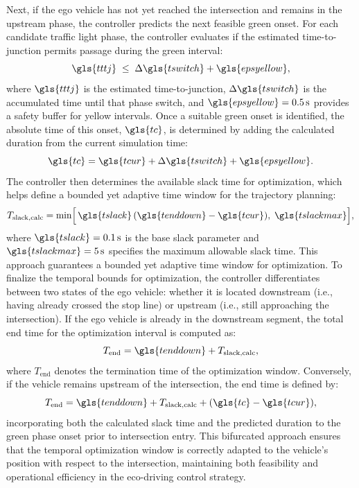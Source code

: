 \mynewline
Next, if the ego vehicle has not yet reached the intersection and remains in the upstream phase, the controller predicts the next feasible green onset. For each candidate traffic light phase, the controller evaluates if the estimated time-to-junction permits passage during the green interval:
\begin{equation}
   \gls{tttj} \;\le\; \Delta \gls{tswitch} + \gls{epsyellow},
\end{equation}
where $\gls{tttj}$ is the estimated time-to-junction, $\Delta \gls{tswitch}$ is the accumulated time until that phase switch, and $\gls{epsyellow}=0.5\,\unit{s}$ provides a safety buffer for yellow intervals. Once a suitable green onset is identified, the absolute time of this onset, $\gls{tc}$, is determined by adding the calculated duration from the current simulation time:
\begin{equation}
   \gls{tc}
   = \gls{tcur} + \Delta\gls{tswitch} + \gls{epsyellow}.
\end{equation}
The controller then determines the available slack time for optimization, which helps define a bounded yet adaptive time window for the trajectory planning:
\begin{equation}
   T_{\mathrm{slack,calc}} = \min\Bigl[\, \gls{tslack}\,(\gls{tenddown} - \gls{tcur}),\; \gls{tslackmax} \Bigr],
\end{equation}
where $\gls{tslack}=0.1\,\unit{s}$ is the base slack parameter and $\gls{tslackmax}=5\,\unit{s}$ specifies the maximum allowable slack time. This approach guarantees a bounded yet adaptive time window for optimization. 
\mynewline
To finalize the temporal bounds for optimization, the controller differentiates between two states of the ego vehicle: whether it is located downstream (i.e., having already crossed the stop line) or upstream (i.e., still approaching the intersection). If the ego vehicle is already in the downstream segment, the total end time for the optimization interval is computed as:
\begin{equation}
   T_{\mathrm{end}} = \gls{tenddown} + T_{\mathrm{slack,calc}},
\end{equation}
where $T_{\mathrm{end}}$ denotes the termination time of the optimization window. Conversely, if the vehicle remains upstream of the intersection, the end time is defined by:
\begin{equation}
   T_{\mathrm{end}} = \gls{tenddown} + T_{\mathrm{slack,calc}} + (\gls{tc} - \gls{tcur}),
\end{equation}
incorporating both the calculated slack time and the predicted duration to the green phase onset prior to intersection entry. This bifurcated approach ensures that the temporal optimization window is correctly adapted to the vehicle’s position with respect to the intersection, maintaining both feasibility and operational efficiency in the eco-driving control strategy.

